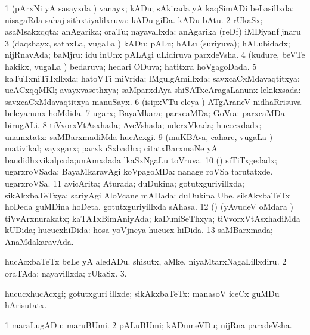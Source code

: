 {{{{{{\bentry
{} 
\gl{\gu}
\expl{}
\bmng
\bnum
\num{1} (pArxNi yA sasayxda \vi) vanayx; kADu; sAkirada yA kaqSimADi beLasillxda; nisagaRda sahaj sithxtiyalilxruva:  kADu giDa.  kADu bAtu. 
\num{2} rUkaSx; asaMsakxqqta; anAgarika; oraTu; nayavallxda:  anAgarika (reDf) iMDiyanf jnaru 
\num{3} (daqshayx, sathxLa, \mo vugaLa \vi) kADu; pALu; hALu (suriyuva); hALubidadx; nijRnavAda; baMjru:  idu inUnx pALAgi uLidiruva parxdeVsha. 
\num{4} (kudure, beVTe hakikx, \mo vugaLa \vi) bedaruva; hedari ODuva; hatitxra hoVgagoDada. 
\num{5} kaTuTxniTiTxllxda; hatoVTi miVrida; lMgulgAmillxda; savxcaCxMdavaqtitxya; ucACxqqMKl; avayxvasethxya; saMparxdAya shiSATxcAragaLanunx lekikxsada:  savxcaCxMdavaqtitxya manuSayx. 
\num{6} (isipxVTu eleya \vi) ATgAraneV nidhaRrisuva beleyanunx hoMdida. 
\num{7} ugarx; BayaMkara; parxcaMDa; GoVra:  parxcaMDa birugALi. 
\num{8} tiVvorxVtAsxhada; AveVshada; uderxVkada; hucecxdadx; unamxtatx:  saMBarxmadiMda hucAcxgi. 
\num{9} (muKBAva, cahare, \mo vugaLa \vi) mativikal; vayxgarx; parxkuSxbadhx; citatxBarxmaNe yA baudidhxvikalpxda;unAmxdada lkaSxNgaLu toVruva. 
\num{10} (\AmA) siTiTxgedadx; ugarxroVSada; BayaMkaravAgi koVpagoMDa:  nanage roVSa tarutatxde.  ugarxroVSa. 
\num{11} avicArita; Aturada; duDukina; gotutxguriyillxda; sikAkxbaTeTxya; sariyAgi AloVcane mADada:  duDukina Uhe.  sikAkxbaTeTx hoDeda guMDina hoDeta.  gotutxguriyillxda sAhasa. 
\num{12} (\AmA) (yAvudeV oMdara \vi) tiVvArxnurakatx; kaTATxBimAniyAda; kaDuniSeThxya; tiVvorxVtAsxhadiMda kUDida; hucucxhiDida:  hosa yoVjneya hucucx hiDida. 
\num{13} saMBarxmada; AnaMdakaravAda. 
\enum
\emng

\noindent 
\gl{\pagu}
\bmng
\bnum
{}  
\banum
{} hucAcxbaTeTx beLe yA aledADu. 
 shisutx, aMke, niyaMtarxNagaLillxdiru. 
\eanum
\numie
\num{2}  oraTAda; nayavillxda; rUkaSx. 
\num{3}. 
\enum
\emng
\eentry

\bentry
{}
\gl{\kirxvi}
\bmng
hucucxhucAcxgi; gotutxguri illxde; sikAkxbaTeTx:  manasoV iceCx guMDu hArisutatx. 
\emng
\eentry

\bentry
{}
\gl{\nA}
\expl{}
\bmng
\bnum
\num{1} maraLugADu; maruBUmi. 
\num{2} pALuBUmi; kADumeVDu; nijRna parxdeVsha. 
\enum
\emng

}}}}}}

